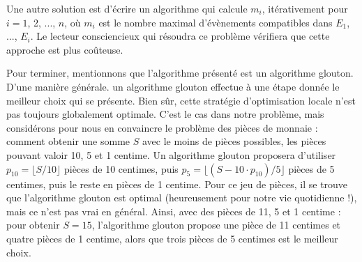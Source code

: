 Une autre solution est d'écrire un algorithme qui calcule $m_i$, itérativement pour $i=1$, 2, ..., $n$, où $m_i$ est le nombre maximal d'évènements compatibles dans $E_1$, ..., $E_i$. Le lecteur consciencieux qui résoudra ce problème vérifiera que cette approche est plus coûteuse.
\medskip

Pour terminer, mentionnons que l'algorithme présenté est un algorithme glouton. D'une manière générale. un algorithme glouton effectue à une étape donnée le meilleur choix qui se présente. Bien sûr, cette stratégie d'optimisation locale n'est pas toujours globalement optimale. C'est le cas dans notre problème, mais considérons pour nous en convaincre le problème des pièces de monnaie : comment obtenir une somme $S$ avec le moins de pièces possibles, les pièces pouvant valoir 10, 5 et 1 centime. Un algorithme glouton proposera d'utiliser $p_{10}=\lfloor S/10 \rfloor$ pièces de 10 centimes, puis $p_5=\lfloor (S-10\cdot p_{10})/5 \rfloor$ pièces de 5 centimes, puis le reste en pièces de 1 centime. Pour ce jeu de pièces, il se trouve que l'algorithme glouton est optimal (heureusement pour notre vie quotidienne !), mais ce n'est pas vrai en général. Ainsi, avec des pièces de 11, 5 et 1 centime : pour obtenir $S=15$, l'algorithme glouton propose une pièce de 11 centimes et quatre pièces de 1 centime, alors que trois pièces de 5 centimes est le meilleur choix.
\bigskip

\Fin
